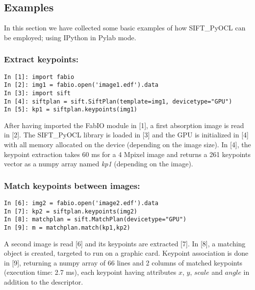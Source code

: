 \documentclass[preprint]{iucr}
\begin{document}
\subsection{Examples}

In this section we have collected some basic examples of how
SIFT\_PyOCL can be employed; using IPython \cite{ipython} in
Pylab \cite{matplotlib} mode.

\subsubsection{Extract keypoints:}
\begin{verbatim}
In [1]: import fabio 
In [2]: img1 = fabio.open('image1.edf').data
In [3]: import sift
In [4]: siftplan = sift.SiftPlan(template=img1, devicetype="GPU")
In [5]: kp1 = siftplan.keypoints(img1)
\end{verbatim}

After having imported the FabIO \cite{fabio} module in [1], a first
absorption image is read in [2]. The SIFT\_PyOCL library is loaded in [3] and the
GPU is initialized in [4] with all memory allocated on the device (depending on
the image size).
In [4], the keypoint extraction takes 60 ms for a
4 Mpixel image and returns a 261 keypoints vector as a numpy array named
\emph{kp1} (depending on the image).

\subsubsection{Match keypoints between images:}
\begin{verbatim}
In [6]: img2 = fabio.open('image2.edf').data
In [7]: kp2 = siftplan.keypoints(img2)
In [8]: matchplan = sift.MatchPlan(devicetype="GPU")
In [9]: m = matchplan.match(kp1,kp2)
\end{verbatim}
A second image is read [6] and its keypoints are extracted [7].
In [8], a matching object is created, targeted to run on a graphic card.  
Keypoint association is done in [9], returning a numpy array of 66 lines and 2
columns of matched keypoints (execution time: 2.7 ms), each keypoint having
attributes $x$, $y$, $scale$ and $angle$ in addition to the descriptor.
\end{document}
